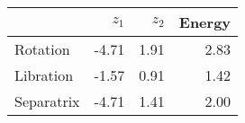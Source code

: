 \begin{tabular}{lrrr}
\toprule
{} &  $z_1$ &  $z_2$ &  Energy \\
\midrule
Rotation   &  -4.71 &   1.91 &    2.83 \\
Libration  &  -1.57 &   0.91 &    1.42 \\
Separatrix &  -4.71 &   1.41 &    2.00 \\
\bottomrule
\end{tabular}
